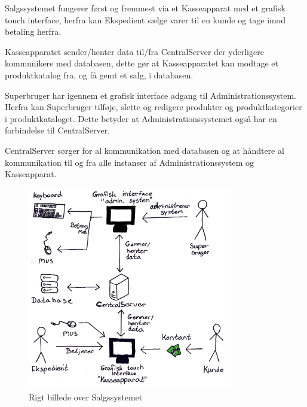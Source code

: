 Salgssystemet fungerer først og fremmest via et Kasseapparat med et grafisk touch interface, herfra kan Ekspedient sælge varer til en kunde og tage imod betaling herfra. 

Kasseapparatet sender/henter data til/fra CentralServer der yderligere kommunikere med databasen, dette gør at Kasseapparatet kan modtage et produktkatalog fra, og få gemt et salg, i databasen. 

Superbruger har igennem et grafisk interface adgang til Administrationssystem. Herfra kan Superbruger tilføje, slette og redigere produkter og produktkategorier i produktkataloget. Dette betyder at Administrationssystemet også har en forbindelse til CentralServer.

CentralServer sørger for al kommunikation med databasen og at håndtere al kommunikation til og fra alle instanser af Administrationssystem og Kasseapparat.


\begin{figure}[!h]
    \centering
    \includegraphics[width=0.8\textwidth]{Systembeskrivelse/RigtBillede3}
    \caption{Rigt billede over Salgssystemet}
    \label{fig:Rigtbill}
\end{figure}